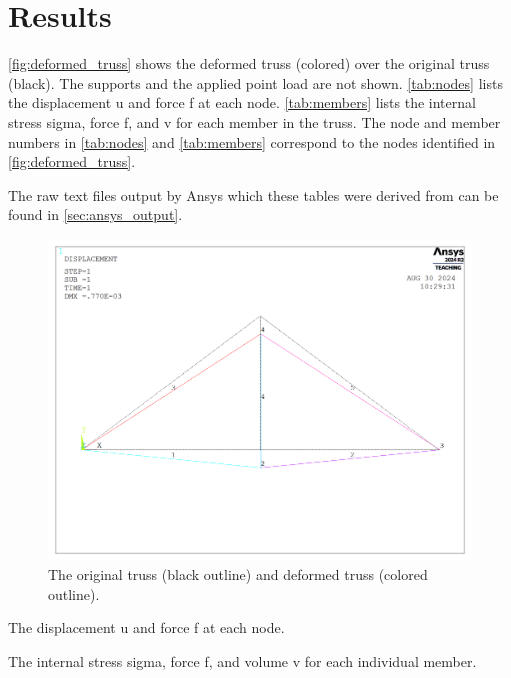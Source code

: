 \chapter{Results}\label{cp:results}

\autoref{fig:deformed_truss} shows the deformed truss (colored) over the original truss (black). The supports and the applied point load are not shown. \autoref{tab:nodes} lists the displacement \gls{u} and force \gls{f} at each node. \autoref{tab:members} lists the internal stress \gls{sigma}, force \gls{f}, and \gls{v} for each member in the truss. The node and member numbers in \autoref{tab:nodes} and \autoref{tab:members} correspond to the nodes identified in \autoref{fig:deformed_truss}.

The raw text files output by Ansys which these tables were derived from can be found in \autoref{sec:ansys_output}.

\begin{figure}[htpb]
    \centering
    \includegraphics[width=\linewidth]{Figures/deformed_shape.png}
    \caption[The original and deformed truss]{The original truss (black outline) and deformed truss (colored outline).}
    \label{fig:deformed_truss}
\end{figure}

\begin{table}[htpb]
    \centering
    \caption[Nodal solutions]{The displacement \gls{u} and force \gls{f} at each node.}
    
    \label{tab:nodes}
\end{table}

\begin{table}[htpb]
    \centering
    \caption[Member solutions]{The internal stress \gls{sigma}, force \gls{f}, and volume \gls{v} for each individual member.}
    
    \label{tab:members}
    \vspace*{5in}
\end{table}